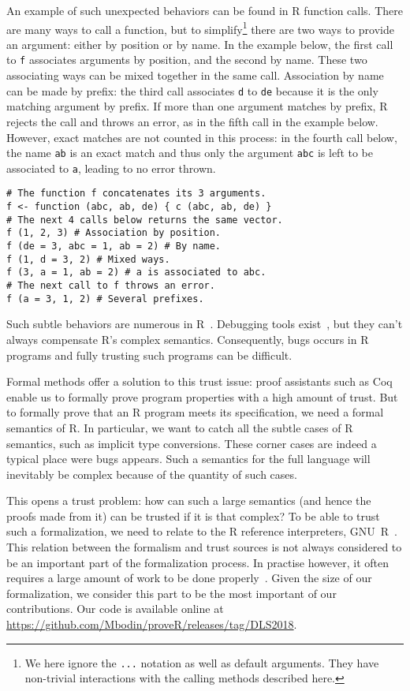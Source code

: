 \documentclass[
    sigplan,
    10pt,
    review, %
    natbib=false %
 ]{acmart}
\begin{document}
An example of such unexpected behaviors can be found
in R function calls.
There are many ways to call a function,
but to simplify\footnote{
    We here ignore the \texttt{...} notation
    as well as default arguments.
    They have non-trivial interactions with the calling methods
    described here.
} there are two ways to provide an argument:
either by position or by name.
In the example below, the first call to \texttt{f}
associates arguments by position, and the second by name.
These two associating ways can be mixed together in the same call.
%
Association by name can be made by prefix:
the third call associates \texttt{d} to \texttt{de}
because it is the only matching argument by prefix.
If more than one argument matches by prefix,
R rejects the call and throws an error,
as in the fifth call in the example below.
However, exact matches are not counted in this process:
in the fourth call below,
the name \texttt{ab} is an exact match
and thus only the argument \texttt{abc}
is left to be associated to \texttt{a},
leading to no error thrown.
\begin{verbatim}
# The function f concatenates its 3 arguments.
f <- function (abc, ab, de) { c (abc, ab, de) }
# The next 4 calls below returns the same vector.
f (1, 2, 3) # Association by position.
f (de = 3, abc = 1, ab = 2) # By name.
f (1, d = 3, 2) # Mixed ways.
f (3, a = 1, ab = 2) # a is associated to abc.
# The next call to f throws an error.
f (a = 3, 1, 2) # Several prefixes.
\end{verbatim}

Such subtle behaviors are numerous in R~\parencite{RInferno}.
Debugging tools exist~\parencite{mcpherson2014},
but they can't always compensate R's complex semantics.
Consequently, bugs occurs in R programs
and fully trusting such programs can be difficult.

Formal methods offer a solution to this trust issue:
proof assistants such as Coq~\parencite{Coq} enable us
to formally prove program properties with a high amount of trust.
But to formally prove that an R program meets its specification,
we need a formal semantics of R.
In particular, we want to catch all the subtle cases of R semantics,
such as implicit type conversions.
These corner cases are indeed a typical place were bugs appears.
Such a semantics for the full language will inevitably be complex
because of the quantity of such cases.

This opens a trust problem:
how can such a large semantics (and hence the proofs made from it)
can be trusted if it is that complex?
To be able to trust such a formalization,
we need to relate to the R reference interpreters, GNU~R~\parencite{Rwebsite}.
This relation between the formalism and trust sources
is not always considered to be an important part of the formalization process.
In practise however, it often requires a large amount of work
to be done properly~\parencite{leroy2014pip}.
Given the size of our formalization,
we consider this part to be the most important of our contributions.
Our code is available online at
\url{https://github.com/Mbodin/proveR/releases/tag/DLS2018}.
\end{document}
